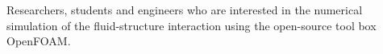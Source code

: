 
Researchers, students and engineers who are interested in the numerical simulation
of the fluid-structure interaction using the open-source tool box OpenFOAM.


